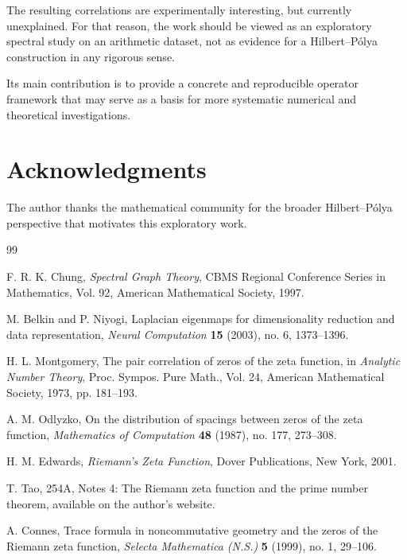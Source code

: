 \documentclass[11pt,a4paper]{article}
\begin{document}
	The resulting correlations are experimentally interesting, but currently unexplained. For that reason, the work should be viewed as an exploratory spectral study on an arithmetic dataset, not as evidence for a Hilbert--P\'olya construction in any rigorous sense.
	
	Its main contribution is to provide a concrete and reproducible operator framework that may serve as a basis for more systematic numerical and theoretical investigations.
	
	\section*{Acknowledgments}
	
	The author thanks the mathematical community for the broader Hilbert--P\'olya perspective that motivates this exploratory work.
	
	\begin{thebibliography}{99}
		
		F. R. K. Chung,
		\emph{Spectral Graph Theory},
		CBMS Regional Conference Series in Mathematics, Vol. 92,
		American Mathematical Society, 1997.
		
		M. Belkin and P. Niyogi,
		Laplacian eigenmaps for dimensionality reduction and data representation,
		\emph{Neural Computation} \textbf{15} (2003), no. 6, 1373--1396.
		
		H. L. Montgomery,
		The pair correlation of zeros of the zeta function,
		in \emph{Analytic Number Theory},
		Proc. Sympos. Pure Math., Vol. 24,
		American Mathematical Society, 1973, pp. 181--193.
		
		A. M. Odlyzko,
		On the distribution of spacings between zeros of the zeta function,
		\emph{Mathematics of Computation} \textbf{48} (1987), no. 177, 273--308.
		
		H. M. Edwards,
		\emph{Riemann's Zeta Function},
		Dover Publications, New York, 2001.
		
		T. Tao,
		254A, Notes 4: The Riemann zeta function and the prime number theorem,
		available on the author's website.
		
		A. Connes,
		Trace formula in noncommutative geometry and the zeros of the Riemann zeta function,
		\emph{Selecta Mathematica (N.S.)} \textbf{5} (1999), no. 1, 29--106.
		
	\end{thebibliography}
	
\end{document}
